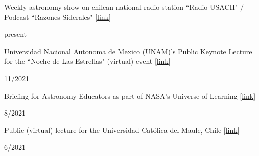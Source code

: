 \documentclass[12pt, a4paper]{article} %
\begin{document}
\begin{minipage}[t]{0.7\textwidth}
\begin{flushleft}%
  \setlength{\leftskip}{0.2cm}%
Weekly astronomy show on chilean national radio station ``Radio USACH" / Podcast ``Razones Siderales" [\href{https://open.spotify.com/show/6sK0izR6pdByqYPt0uuoal}{link}]
\end{flushleft}
\end{minipage}
\begin{minipage}[t]{0.3\textwidth}
\hfill present
\end{minipage}

\vspace{0.2cm}

\begin{minipage}[t]{0.7\textwidth}
\begin{flushleft}%
  \setlength{\leftskip}{0.2cm}%
Universidad Nacional Autonoma de Mexico (UNAM)'s Public Keynote Lecture for the ``Noche de Las Estrellas" (virtual) event  [\href{https://youtu.be/6wq0XPsIdOk?t=12911}{link}]
\end{flushleft}
\end{minipage}
\begin{minipage}[t]{0.3\textwidth}
\hfill 11/2021
\end{minipage}

\vspace{0.2cm}

\begin{minipage}[t]{0.7\textwidth}
\begin{flushleft}%
  \setlength{\leftskip}{0.2cm}%
Briefing for Astronomy Educators as part of NASA's Universe of Learning [\href{https://www.universe-of-learning.org/science-briefings/2021/8/12/webb-unfolding-the-universe}{link}]
\end{flushleft}
\end{minipage}
\begin{minipage}[t]{0.3\textwidth}
\hfill 8/2021
\end{minipage}

\vspace{0.2cm}

\begin{minipage}[t]{0.7\textwidth}
\begin{flushleft}%
  \setlength{\leftskip}{0.2cm}%
Public (virtual) lecture for the Universidad Cat\'olica del Maule, Chile [\href{https://www.youtube.com/watch?v=vTd1w5LZnxA&list=PLZzSGxpMedi4A1anthGHRVeT0zMKOcYZo&index=6}{link}]
\end{flushleft}
\end{minipage}
\begin{minipage}[t]{0.3\textwidth}
\hfill 6/2021
\end{minipage}
\end{document}
